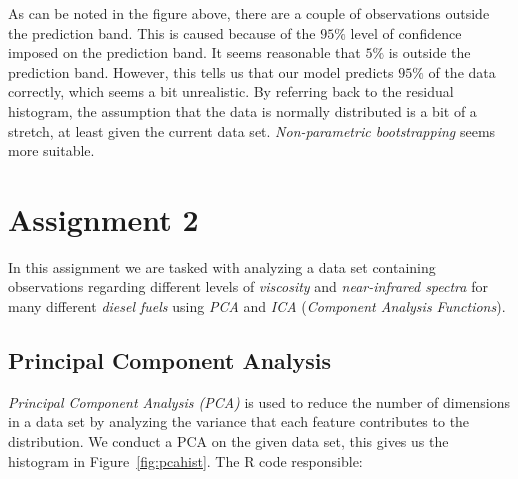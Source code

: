 \documentclass[a4paper,12pt]{article}
\begin{document}
        As can be noted in the figure above, there are a couple of observations outside the prediction band. This is caused because of the $95 \%$ level of confidence imposed on the prediction band. It seems reasonable that $5 \%$ is outside the prediction band. However, this tells us that our model predicts $95 \%$ of the data correctly, which seems a bit unrealistic. By referring back to the residual histogram, the assumption that the data is normally distributed is a bit of a stretch, at least given the current data set. \emph{Non-parametric bootstrapping} seems more suitable.


    \section*{Assignment 2}

        In this assignment we are tasked with analyzing a data set containing observations regarding different levels of \emph{viscosity} and \emph{near-infrared spectra} for many different \emph{diesel fuels} using \emph{PCA} and \emph{ICA} (\emph{Component Analysis Functions}).

    \subsection*{Principal Component Analysis}

        \emph{Principal Component Analysis (PCA)} is used to reduce the number of dimensions in a data set by analyzing the variance that each feature contributes to the distribution. We conduct a PCA on the given data set, this gives us the histogram in Figure~\ref{fig:pcahist}. The R code responsible:

        
\end{document}
